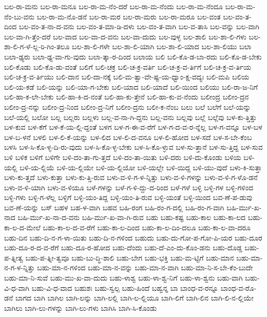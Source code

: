 {ಬಲ-ರಾ-ಮನು
ಬಲ-ರಾ-ಮನೂ
ಬಲ-ರಾ-ಮ-ನೆಂ-ದರೆ
ಬಲ-ರಾ-ಮ-ನೆಂದು
ಬಲ-ರಾ-ಮ-ನೆಂದೂ
ಬಲ-ರಾ-ಮ-ನೆಂ-ಬು-ವನು
ಬಲ-ರಾ-ಮ-ನೊ-ಡನೆ
ಬಲ-ರಾ-ಮರ
ಬಲ-ರಾ-ಮರು
ಬಲ-ರಾ-ಮರೂ
ಬಲ-ವಂತ
ಬಲ-ವಂ-ತ-ದಿಂದ
ಬಲ-ವಂ-ತ-ನಾ-ದ-ವನು
ಬಲ-ವಂ-ತ-ಮಾ-ಡಿ-ದಳು
ಬಲ-ವಂ-ತ-ವಾಗಿ
ಬಲ-ವ-ತಾಸಿ
ಬಲ-ವನ್ನು
ಬಲ-ವಾಗಿ
ಬಲ-ವಾ-ಗಿ-ತ್ತೆಂ-ದರೆ
ಬಲ-ವಾದ
ಬಲ-ವಾ-ದ-ವನು
ಬಲ-ವಾ-ದುದು
ಬಲ-ವುಳ್ಳ
ಬಲ-ಶಾಲಿ
ಬಲ-ಶಾ-ಲಿ-ಗಳು
ಬಲ-ಶಾ-ಲಿ-ಗ-ಳೆ-ಲ್ಲ-ರಿ-ಗಿಂ-ತಲೂ
ಬಲ-ಶಾ-ಲಿ-ಗಳೇ
ಬಲ-ಶಾ-ಲಿ-ಯಾಗಿ
ಬಲ-ಶಾ-ಲಿ-ಯಾದ
ಬಲ-ಶಾ-ಲಿಯು
ಬಲಾ
ಬಲಾ-ಢ್ಯರು
ಬಲಾ-ಢ್ಯ-ವಾ-ಗು-ವುದು
ಬಲಾ-ತ್ಕಾ-ರ-ದಿಂದ
ಬಲಾಯ
ಬಲಿ
ಬಲಿ-ಕೊ-ಡ-ಬಾ-ರದು
ಬಲಿ-ಕೊ-ಡ-ಬೇಕು
ಬಲಿ-ಕೊಡು
ಬಲಿ-ಕೊ-ಡು-ವಂತೆ
ಬಲಿಗೆ
ಬಲಿ-ಚಕ್ರ
ಬಲಿ-ಚ-ಕ್ರ-ವರ್ತಿ
ಬಲಿ-ಚ-ಕ್ರ-ವ-ರ್ತಿಗೆ
ಬಲಿ-ಚ-ಕ್ರ-ವ-ರ್ತಿಯ
ಬಲಿ-ಚ-ಕ್ರ-ವ-ರ್ತಿಯು
ಬಲಿ-ದಾನ
ಬಲಿ-ದಾ-ನಕ್ಕೆ
ಬಲಿ-ಮ-ತ್ವಾ-ವೇ-ಷ್ಟ-ಯ-ಧ್ವಾಂ-ಕ್ಷ-ವದ್ಯಃ
ಬಲಿ-ಮಪಿ
ಬಲಿಯ
ಬಲಿ-ಯ-ಕಡೆ
ಬಲಿ-ಯನ್ನು
ಬಲಿ-ಯಾ-ಗ-ಬೇಕು
ಬಲಿ-ಯಾದ
ಬಲಿ-ಯಾದೆ
ಬಲಿ-ಯಿಂದ
ಬಲಿಯು
ಬಲಿ-ರಾ-ಜ-ನಿಗೆ
ಬಲಿ-ಹಾ-ಕ-ಲೇ-ಬೇಕು
ಬಲಿ-ಹಾ-ಕಿ-ದ-ನಂತೆ
ಬಲಿ-ಹಾ-ಕು-ತ್ತೇನೆ
ಬಲಿ-ಹಾ-ಕು-ವ-ನೆಂದು
ಬಲೀಂದ್ರ
ಬಲೀಂ-ದ್ರನ
ಬಲೀಂ-ದ್ರ-ನನ್ನು
ಬಲೀಂ-ದ್ರ-ನಿಂದ
ಬಲೀಂ-ದ್ರ-ನಿಗೆ
ಬಲೀಂ-ದ್ರನು
ಬಲೀ-ಕ-ನೆಂಬ
ಬಲು
ಬಲೆ
ಬಲೆಗೆ
ಬಲೆ-ಯನ್ನು
ಬಲೆ-ಯಲ್ಲಿ
ಬಲೋ
ಬಲ್ಲ
ಬಲ್ಲರು
ಬಲ್ಲಳು
ಬಲ್ಲ-ವ-ನಾ-ಗಿ-ದ್ದನು
ಬಲ್ಲ-ವನು
ಬಲ್ಲವು
ಬಲ್ಲೆ
ಬಲ್ಲೆವು
ಬಳ-ಕು-ತ್ತಿತ್ತು
ಬಳ-ಕುವ
ಬಳ-ಕೆಗೆ
ಬಳ-ಕೆ-ಯ-ಲ್ಲಿ-ದ್ದಂತೆ
ಬಳಗ
ಬಳ-ಗ-ಈ-ವ-ರೆಗೆ
ಬಳ-ಗ-ದ-ವ-ರ-ನ್ನೆಲ್ಲ
ಬಳ-ಗ-ವನ್ನೂ
ಬಳ-ಬಳ
ಬಳ-ಬ-ಳನೆ
ಬಳಲಿ
ಬಳ-ಲಿ-ಕೆ-ಯನ್ನು
ಬಳ-ಲಿದ
ಬಳ-ಲಿ-ದ-ವನೂ
ಬಳ-ಲಿ-ಹೋದ
ಬಳ-ಸದೆ
ಬಳ-ಸ-ಬೇ-ಕೆಂಬ
ಬಳಸಿ
ಬಳ-ಸಿ-ಕೊ-ಳ್ಳ-ದಿ-ರು-ವುದು
ಬಳ-ಸಿ-ಕೊ-ಳ್ಳ-ಬೇಕು
ಬಳ-ಸಿ-ಕೊ-ಳ್ಳುವ
ಬಳ-ಸು-ತ್ತಾನೆ
ಬಳ-ಸು-ತ್ತಿದ್ದ
ಬಳ-ಸುವ
ಬಳಿ
ಬಳಿಕ
ಬಳಿಗೆ
ಬಳಿಗೇ
ಬಳಿ-ದಂ-ತಾ-ಗು-ತ್ತದೆ
ಬಳಿ-ದಂ-ತಾ-ಯಿತು
ಬಳಿ-ದರು
ಬಳಿ-ದು-ಕೊಂಡು
ಬಳಿಯ
ಬಳಿ-ಯಲ್ಲಿ
ಬಳಿ-ಯ-ಲ್ಲಿಯೆ
ಬಳಿ-ಯ-ಲ್ಲಿಯೇ
ಬಳಿ-ಯ-ಲ್ಲಿಯೋ
ಬಳಿ-ಯಲ್ಲೇ
ಬಳಿ-ಯಿದ್ದ
ಬಳಿ-ಯು-ವುದೆ
ಬಳು-ಕಿ-ಸುತ್ತಾ
ಬಳು-ಕು-ತ್ತದೆ
ಬಳು-ಕುತ್ತಾ
ಬಳು-ಕು-ತ್ತಿ-ರುವ
ಬಳು-ವ-ಳಿ-ಗ-ಳ-ನ್ನಿತ್ತು
ಬಳು-ವ-ಳಿ-ಗಳನ್ನು
ಬಳು-ವ-ಳಿ-ಗ-ಳೊ-ಡನೆ
ಬಳು-ವ-ಳಿ-ಯಾಗಿ
ಬಳು-ವ-ಳಿಯೂ
ಬಳೆ-ಗಳನ್ನು
ಬಳೆ-ಗ-ಳಿ-ದ್ದು-ದ-ರಿಂದ
ಬಳೆ-ಗಳೆ
ಬಳ್ಳಿ
ಬಳ್ಳಿ-ಗಳ
ಬಳ್ಳಿ-ಗಳಿಂದ
ಬಳ್ಳಿ-ಗಳು
ಬಳ್ಳಿ-ಗ-ಳೆಲ್ಲ
ಬಳ್ಳಿಗೆ
ಬಳ್ಳಿ-ಯಂ-ತಿದ್ದ
ಬಳ್ಳಿ-ಯಂ-ತಿ-ರುವ
ಬಳ್ಳಿ-ಯಂತೆ
ಬಳ್ಳಿ-ಯಿಂದ
ಬವ-ಣೆ-ಪ-ಡುವು
ಬವ-ಣೆ-ಯನ್ನು
ಬಸ್
ಬಹಳ
ಬಹ-ಳ-ವಾಗಿ
ಬಹವ
ಬಹಿ-ರಂಗ
ಬಹಿ-ರಂ-ಗ-ದಲ್ಲಿ
ಬಹಿ-ರಂ-ಗ-ವಾಗಿ
ಬಹಿ-ರ್ಮು-ಖ-ನಾದ
ಬಹಿ-ರ್ಮು-ಖ-ನಾ-ದ-ವನು
ಬಹಿ-ರ್ಮು-ಖ-ವಾ-ಗಿ-ರುವ
ಬಹು
ಬಹು-ಕಷ್ಟ
ಬಹು-ಕಾಲ
ಬಹು-ಕಾ-ಲದ
ಬಹು-ಕಾ-ಲ-ದ-ಮೇಲೆ
ಬಹು-ಕಾ-ಲ-ದ-ವ-ರೆಗೆ
ಬಹು-ಕಾ-ಲ-ದಿಂದ
ಬಹು-ಕಾ-ಲ-ದಿಂ-ದಲೂ
ಬಹು-ಕಾ-ಲ-ವಾ-ದರೂ
ಬಹು-ದಿನ
ಬಹು-ದಿ-ನ-ಗ-ಳಾ-ಯಿತು
ಬಹು-ದಿ-ನ-ಗಳಿಂದ
ಬಹುದು
ಬಹು-ದು-ಗೋ-ಪ-ಗೋ-ಪಿ-ಯರ
ಬಹು-ದೂರ
ಬಹು-ದೂ-ರ-ದ-ವ-ರೆಗೆ
ಬಹು-ದೂ-ರ-ಹೋದ
ಬಹು-ದೆಂದು
ಬಹು-ದೆ-ಎಂ-ದು-ಕೊಂ-ಡನು
ಬಹು-ದೊಡ್ಡ
ಬಹು-ಪ-ತ್ನೀತ್ವ
ಬಹು-ಪ-ತ್ನೀ-ತ್ವವೂ
ಬಹು-ಬು-ದ್ಧಿ-ಶಾಲಿ
ಬಹು-ಬೇಗ
ಬಹು-ಭಕ್ತಿ
ಬಹು-ಮ-ಟ್ಟಿಗೆ
ಬಹು-ಮಾನ
ಬಹು-ಮಾ-ನ-ಗ-ಳ-ನ್ನಿತ್ತು
ಬಹು-ಮಾ-ನ-ಗಳಿಂದ
ಬಹು-ಮಾ-ನ-ವನ್ನು
ಬಹು-ಮಾ-ನ-ವಾಗಿ
ಬಹು-ಮಾ-ನಿ-ಸ-ಬೇ-ಕೆಂ-ಬುದೇ
ಬಹು-ಮಾ-ನಿ-ಸುವೆ
ಬಹು-ಮು-ಖ-ವಾ-ದುದು
ಬಹು-ಳಾಶ್ವ
ಬಹು-ಳಾ-ಶ್ವ-ನಿಗೆ
ಬಹು-ಳಾ-ಶ್ವನು
ಬಹು-ವಾಗಿ
ಬಹು-ವಿ-ಧ-ವಾಗಿ
ಬಹು-ವಿ-ಧ-ವಾದ
ಬಹುಶಃ
ಬಹು-ಸ್ವಲ್ಪ
ಬಹು-ಹಿಂದೆ
ಬಹ್ವನ್ನ
ಬಾ
ಬಾಂಧ-ವ-ರನ್ನೂ
ಬಾಂಧ-ವ-ರೊ-ಡನೆ
ಬಾಗದ
ಬಾಗಿ
ಬಾಗಿಲ
ಬಾಗಿ-ಲನ್ನು
ಬಾಗಿ-ಲಲ್ಲಿ
ಬಾಗಿ-ಲ-ಲ್ಲಿಯೂ
ಬಾಗಿ-ಲಿಗೆ
ಬಾಗಿ-ಲಿನ
ಬಾಗಿ-ಲಿ-ನ-ಲ್ಲಿಯೇ
ಬಾಗಿಲು
ಬಾಗಿ-ಲು-ಗಳನ್ನು
ಬಾಗಿ-ಲು-ಗಳು
ಬಾಗಿಸಿ
ಬಾಗಿ-ಸಿ-ಕೊಂಡು
}
